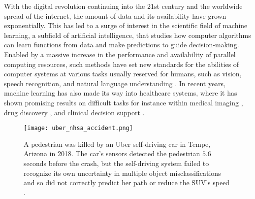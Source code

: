 With the digital revolution continuing into the 21st century and the worldwide spread of the internet, the amount of data and its availability have grown exponentially. 
This has led to a surge of interest in the scientific field of machine learning, a subfield of artificial intelligence, that studies how computer algorithms can learn functions from data and make predictions to guide decision-making. 
Enabled by a massive increase in the performance and availability of parallel computing resources, such methods have set new standards for the abilities of computer systems at various tasks usually reserved for humans, such as vision, speech recognition, and natural language understanding \parencite{lecun_deep_2015}. 
In recent years, machine learning has also made its way into healthcare systems, where it has shown promising results on difficult tasks for instance within medical imaging \parencite{lundervold_overview_2019}, drug discovery \parencite{chen_rise_2018}, and clinical decision support \parencite{cite15, cite14}. 

\begin{figure}[t]
    \centering
    \texttt{[image: uber\_nhsa\_accident.png]}
    \caption[A pedestrian was killed by an Uber self-driving car in Tempe, Arizona in 2018.]{ A pedestrian was killed by an Uber self-driving car in Tempe, Arizona in 2018. The car's sensors detected the pedestrian $5.6$ seconds before the crash, but the self-driving system failed to recognize its own uncertainty in multiple object misclassifications and so did not correctly predict her path or reduce the SUV's speed \parencite[photo credit]{nationaltransportationsafetyboardnhsa_collision_2019}.}
    \label{fig:uber_nhsa_accident}
\end{figure}



